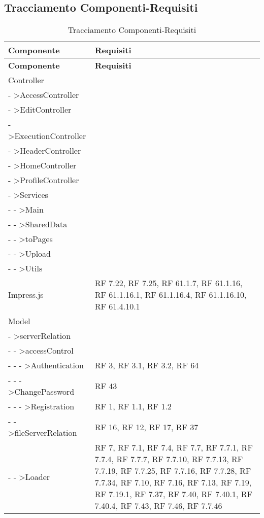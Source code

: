 \subsection{Tracciamento Componenti-Requisiti}{ 
\renewcommand*{\arraystretch}{1.4} 
\begin{longtable} [c]{| p{8cm} | p{5cm} |} 
\caption{Tracciamento Componenti-Requisiti \label{tab:traccCompReq}}\\ \hline\textbf{Componente} & \textbf{Requisiti} \\ 
\hline \endfirsthead \hline 
\textbf{Componente} & \textbf{Requisiti} \\ 
\hline \endhead \hline \endfoot \hline \endlastfoot 
Controller & \\ 
 \hline 
- >AccessController & \\ 
 \hline 
- >EditController & \\ 
 \hline 
- >ExecutionController & \\ 
 \hline 
- >HeaderController & \\ 
 \hline 
- >HomeController & \\ 
 \hline 
- >ProfileController & \\ 
 \hline 
- >Services & \\ 
 \hline 
- - >Main & \\ 
 \hline 
- - >SharedData & \\ 
 \hline 
- - >toPages & \\ 
 \hline 
- - >Upload & \\ 
 \hline 
- - >Utils & \\ 
 \hline 
Impress.js & RF 7.22, RF 7.25, RF 61.1.7, RF 61.1.16, RF 61.1.16.1, RF 61.1.16.4, RF 61.1.16.10, RF 61.4.10.1\\ 
 \hline 
Model & \\ 
 \hline 
- >serverRelation & \\ 
 \hline 
- - >accessControl & \\ 
 \hline 
- - - >Authentication & RF 3, RF 3.1, RF 3.2, RF 64\\ 
 \hline 
- - - >ChangePassword & RF 43\\ 
 \hline 
- - - >Registration & RF 1, RF 1.1, RF 1.2\\ 
 \hline 
- - >fileServerRelation & RF 16, RF 12, RF 17, RF 37\\ 
 \hline 
- - >Loader & RF 7, RF 7.1, RF 7.4, RF 7.7, RF 7.7.1, RF 7.7.4, RF 7.7.7, RF 7.7.10, RF 7.7.13, RF 7.7.19, RF 7.7.25, RF 7.7.16, RF 7.7.28, RF 7.7.34, RF 7.10, RF 7.16, RF 7.13, RF 7.19, RF 7.19.1, RF 7.37, RF 7.40, RF 7.40.1, RF 7.40.4, RF 7.43, RF 7.46, RF 7.7.46\\ 

\end{longtable}}

